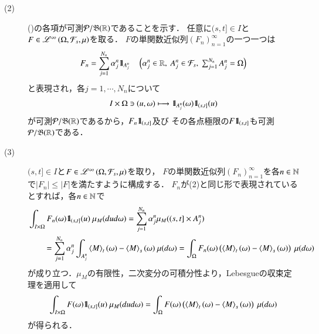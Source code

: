 \begin{prf}
\begin{description}
			\item[(2)] 
				()の各項が可測$\mathcal{P}/\mathfrak{B}(\mathbb{R})$であることを示す．
				任意に$(s,t] \in I$と$F \in \mathscr{L}^{\infty} \left(\Omega,\mathcal{F}_s,\mu\right)$を取る．
				$F$の単関数近似列$(F_n)_{n=1}^{\infty}$の一つ一つは
				\begin{align}
					F_n = \sum_{j=1}^{N_n} \alpha_j^n \defunc_{A_j^n} \quad \left( \alpha_j^n \in \R,\ A_j^n \in \mathcal{F}_s,\ \mbox{$\sum_{j=1}^{N_n}A_j^n = \Omega$} \right)
				\end{align}
				と表現され，各$j=1,\cdots,N_n$について
				\begin{align}
					I \times \Omega \ni (u,\omega) \longmapsto \mbox{1}\hspace{-0.25em}\mbox{l}_{A_j^n}(\omega) \mbox{1}\hspace{-0.25em}\mbox{l}_{(s,t]}(u)
				\end{align}
				が可測$\mathcal{P}/\mathfrak{B}(\mathbb{R})$であるから，$F_n \mbox{1}\hspace{-0.25em}\mbox{l}_{(s,t]}$及び
				その各点極限の$F \mbox{1}\hspace{-0.25em}\mbox{l}_{(s,t]}$も可測$\mathcal{P}/\mathfrak{B}(\mathbb{R})$である．
			
			\item[(3)]
				$(s,t] \in I$と$F \in \mathscr{L}^{\infty} \left(\Omega,\mathcal{F}_s,\mu\right)$を取り，
				$F$の単関数近似列$(F_n)_{n=1}^{\infty}$を各$n \in \mathbb{N}$で$|F_n| \leq |F|$を満たすように構成する．
				$F_n$が(2)と同じ形で表現されているとすれば，各$n \in \mathbb{N}$で
				\begin{align}
					&\int_{I \times \Omega} F_n(\omega) \defunc_{(s,t]}(u)\ \mu_M(dud\omega)
					= \sum_{j=1}^{N_n} \alpha_j^n \mu_M((s,t] \times A_j^n) \\
					&\qquad = \sum_{j=1}^{N_n} \alpha_j^n \int_{A_j^n} \inprod<M>_t(\omega) - \inprod<M>_s(\omega)\ \mu(d\omega)
					= \int_\Omega F_n(\omega) \left(\inprod<M>_t(\omega) - \inprod<M>_s(\omega)\right)\ \mu(d\omega)
				\end{align}
				が成り立つ．$\mu_M$の有限性，二次変分の可積分性より，Lebesgueの収束定理を適用して
				\begin{align}
					\int_{I \times \Omega} F(\omega) \defunc_{(s,t]}(u)\ \mu_M(dud\omega)
					= \int_\Omega F(\omega) \left(\inprod<M>_t(\omega) - \inprod<M>_s(\omega)\right)\ \mu(d\omega)
				\end{align}
				が得られる．
				

\end{description}
\end{prf}
